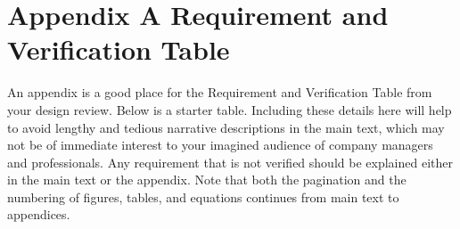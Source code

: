 \clearpage
\section*{Appendix A \qquad	Requirement and Verification Table}

An appendix is a good place for the Requirement and Verification Table from your design review. Below is a starter table. Including these details here will help to avoid lengthy and tedious narrative descriptions in the main text, which may not be of immediate interest to your imagined audience of company managers and professionals. Any requirement that is not verified should be explained either in the main text or the appendix. Note that both the pagination and the numbering of figures, tables, and equations continues from main text to appendices.

